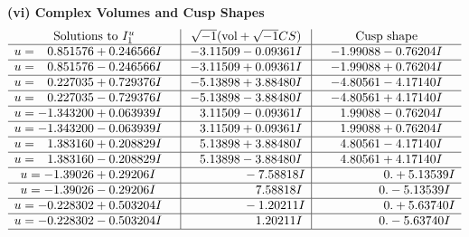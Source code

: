 \documentclass[1p]{elsarticle_modified}
\theoremstyle{definition}
\newcommand{\I}{\sqrt{-1}}
\begin{document}
\newpage\flushleft \textbf{(vi) Complex Volumes and Cusp Shapes}
$$\begin{array}{c|c|c}  
\text{Solutions to }I^u_{1}& \I (\text{vol} + \sqrt{-1}CS) & \text{Cusp shape}\\
 \hline 
\begin{aligned}
u &= \phantom{-}0.851576 + 0.246566 I\end{aligned}
 & -3.11509 - 0.09361 I & -1.99088 - 0.76204 I \\ \hline\begin{aligned}
u &= \phantom{-}0.851576 - 0.246566 I\end{aligned}
 & -3.11509 + 0.09361 I & -1.99088 + 0.76204 I \\ \hline\begin{aligned}
u &= \phantom{-}0.227035 + 0.729376 I\end{aligned}
 & -5.13898 + 3.88480 I & -4.80561 - 4.17140 I \\ \hline\begin{aligned}
u &= \phantom{-}0.227035 - 0.729376 I\end{aligned}
 & -5.13898 - 3.88480 I & -4.80561 + 4.17140 I \\ \hline\begin{aligned}
u &= -1.343200 + 0.063939 I\end{aligned}
 & \phantom{-}3.11509 - 0.09361 I & \phantom{-}1.99088 - 0.76204 I \\ \hline\begin{aligned}
u &= -1.343200 - 0.063939 I\end{aligned}
 & \phantom{-}3.11509 + 0.09361 I & \phantom{-}1.99088 + 0.76204 I \\ \hline\begin{aligned}
u &= \phantom{-}1.383160 + 0.208829 I\end{aligned}
 & \phantom{-}5.13898 + 3.88480 I & \phantom{-}4.80561 - 4.17140 I \\ \hline\begin{aligned}
u &= \phantom{-}1.383160 - 0.208829 I\end{aligned}
 & \phantom{-}5.13898 - 3.88480 I & \phantom{-}4.80561 + 4.17140 I \\ \hline\begin{aligned}
u &= -1.39026 + 0.29206 I\end{aligned}
 & \phantom{-0.000000 } -7.58818 I & \phantom{-0.000000 -}0. + 5.13539 I \\ \hline\begin{aligned}
u &= -1.39026 - 0.29206 I\end{aligned}
 & \phantom{-0.000000 -}7.58818 I & \phantom{-0.000000 } 0. - 5.13539 I \\ \hline\begin{aligned}
u &= -0.228302 + 0.503204 I\end{aligned}
 & \phantom{-0.000000 } -1.20211 I & \phantom{-0.000000 -}0. + 5.63740 I \\ \hline\begin{aligned}
u &= -0.228302 - 0.503204 I\end{aligned}
 & \phantom{-0.000000 -}1.20211 I & \phantom{-0.000000 } 0. - 5.63740 I\\
 \hline 
 \end{array}$$\newpage
\end{document}
